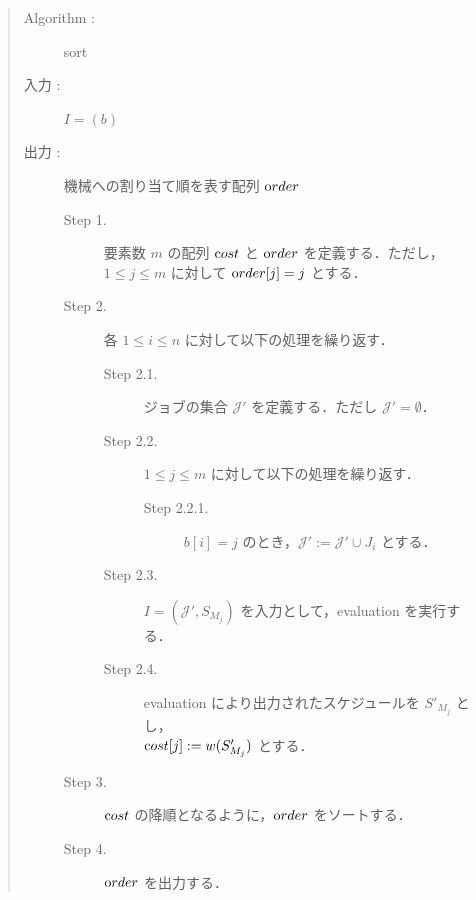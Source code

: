 \documentclass[12pt]{optlab-bachelor}
\begin{document}
\begin{quote}
  \begin{description}
    \item[{\sc Algorithm : }] {\sc sort}
    \item[入力 :] $I = (b)$
    \item[出力 :] 機械への割り当て順を表す配列 ${\mbox order}$
    \begin{description}
      \item[Step 1.] 要素数 $m$ の配列 ${\mbox cost}$ と ${\mbox order}$ を定義する．ただし，$1 \le j \le m $ に対して ${\mbox order}[j] = j$ とする．
      \item[Step 2.] 各 $1 \le i \le n$ に対して以下の処理を繰り返す．
      \begin{description}
        \item[Step 2.1.] ジョブの集合 $\mathcal{J}'$ を定義する．ただし $\mathcal{J}' = \emptyset$．
        \item[Step 2.2.] $1 \le j \le m$ に対して以下の処理を繰り返す．
        \begin{description}
          \item[Step 2.2.1.] $b[i] = j$ のとき，$\mathcal{J}' :=\mathcal{J}' \cup J_i$ とする．
        \end{description}
        \item[Step 2.3.] $I = (\mathcal{J}',S_{M_j})$ を入力として，{\sc evaluation} を実行する．
        \item[Step 2.4.] {\sc evaluation} により出力されたスケジュールを $S'_{M_j}$ とし，\\${\mbox cost}[j] := w(S'_{M_j})$ とする．
      \end{description}
      \item[Step 3.] ${\mbox cost}$ の降順となるように，${\mbox order}$ をソートする．
      \item[Step 4.] ${\mbox order}$ を出力する．
    \end{description}
  \end{description}
\end{quote}
\end{document}
